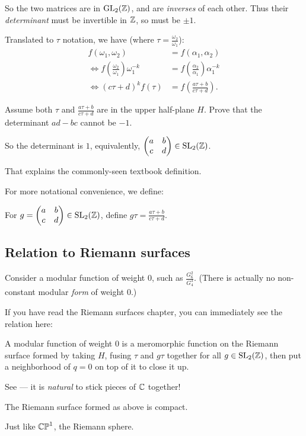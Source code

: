 So the two matrices are in $\operatorname{GL}_2(\mathbb Z)$, and are \emph{inverses} of each other.
Thus their \emph{determinant} must be invertible in $\mathbb Z$, so must be $\pm 1$.

Translated to $\tau$ notation, we have (where $\tau = \frac{\omega_2}{\omega_1}$):
\begin{align*}
	f(\omega_1, \omega_2) &= f(\alpha_1, \alpha_2) \\
	\iff f\left(\frac{\omega_2}{\omega_1}\right) \omega_1^{-k}
						  &= f\left(\frac{\alpha_2}{\alpha_1}\right) \alpha_1^{-k} \\
	\iff (c \tau+d)^k f(\tau) &= f\left(\frac{a \tau+b}{c \tau+d}\right).
\end{align*}

\begin{exercise}
	Assume both $\tau$ and $\frac{a \tau+b}{c \tau+d}$ are in the upper half-plane $H$.
	Prove that the determinant $ad-bc$ cannot be $-1$.
\end{exercise}

So the determinant is $1$, equivalently,
$\begin{pmatrix} a&b \\ c&d \end{pmatrix} \in \operatorname{SL}_2(\mathbb Z)$.

That explains the commonly-seen textbook definition.

For more notational convenience, we define:
\begin{definition}
	For $g = \begin{pmatrix} a&b \\ c&d \end{pmatrix} \in \operatorname{SL}_2(\mathbb Z)$,
	define $g \tau = \frac{a \tau+b}{c \tau+d}$.
\end{definition}

\subsection{Relation to Riemann surfaces}

Consider a modular function of weight $0$, such as $\frac{G_6^2}{G_4^3}$.
(There is actually no non-constant modular \emph{form} of weight $0$.)

If you have read the Riemann surfaces chapter, you can immediately see the relation here:
\begin{moral}
	A modular function of weight $0$ is a meromorphic function on the Riemann surface formed by
	taking $H$, fusing $\tau$ and $g \tau$ together for all $g \in \operatorname{SL}_2(\mathbb Z)$,
	then put a neighborhood of $q=0$ on top of it to close it up.
\end{moral}

See --- it is \emph{natural} to stick pieces of $\mathbb C$ together!

\begin{theorem}
	The Riemann surface formed as above is compact.
\end{theorem}

Just like $\mathbb{CP}^1$, the Riemann sphere.

